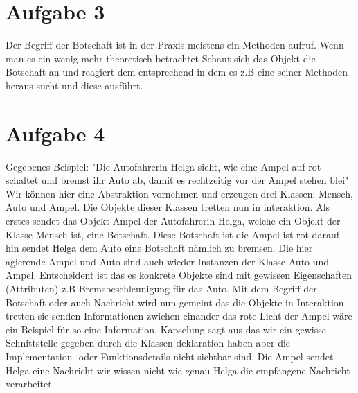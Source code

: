 \documentclass[12pt]{article}
\begin{document}
\section*{Aufgabe 3}

Der Begriff der Botschaft ist in der Praxis meistens ein Methoden aufruf. Wenn man es ein wenig mehr theoretisch betrachtet Schaut sich das Objekt die Botschaft an und reagiert dem entsprechend in dem es z.B eine seiner Methoden heraus sucht und diese ausführt.

\section*{Aufgabe 4}
Gegebenes Beispiel: "Die Autofahrerin Helga sieht, wie eine Ampel auf rot schaltet und bremst ihr Auto ab, damit es rechtzeitig vor der Ampel stehen blei"\\

\noindent
Wir können hier eine Abstraktion vornehmen und erzeugen drei Klassen: Mensch, Auto und Ampel. Die Objekte dieser Klassen tretten nun in interaktion. Als erstes sendet das Objekt Ampel der Autofahrerin Helga, welche ein Objekt der Klasse Mensch ist, eine Botschaft. Diese Botschaft ist die Ampel ist rot darauf hin sendet Helga dem Auto eine Botschaft nämlich zu bremsen. Die hier agierende Ampel und Auto sind auch wieder Instanzen der Klasse Auto und Ampel. Entscheident ist das es konkrete Objekte sind mit gewissen Eigenschaften (Attributen) z.B Bremsbeschleunigung für das Auto. Mit dem Begriff der Botschaft oder auch Nachricht wird nun gemeint das die Objekte in Interaktion tretten sie senden Informationen zwichen einander das rote Licht der Ampel wäre ein Beispiel für so eine Information. Kapselung sagt aus das wir ein gewisse Schnittstelle gegeben durch die Klassen deklaration haben aber die Implementation- oder Funktionsdetails nicht sichtbar sind. Die Ampel sendet Helga eine Nachricht wir wissen nicht wie genau Helga die empfangene Nachricht verarbeitet.
\end{document}
